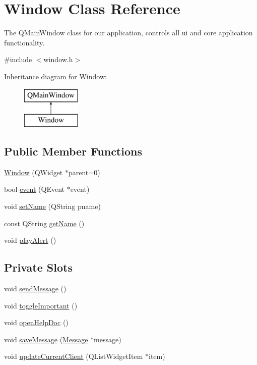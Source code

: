\hypertarget{class_window}{}\section{Window Class Reference}
\label{class_window}


The Q\+Main\+Window class for our application, controls all ui and core application functionality.  




{\ttfamily \#include $<$window.\+h$>$}

Inheritance diagram for Window\+:\begin{figure}[H]
\begin{center}
\leavevmode
\includegraphics[height=2.000000cm]{class_window}
\end{center}
\end{figure}
\subsection*{Public Member Functions}
\begin{DoxyCompactItemize}
\item 
\hyperlink{class_window_ab27fe44e0834066236f79f244b02f67e}{Window} (Q\+Widget $\ast$parent=0)
\item 
bool \hyperlink{class_window_a0af393c895469fe202200eefb7e43e5e}{event} (Q\+Event $\ast$event)
\item 
void \hyperlink{class_window_a881940d1cff5b0ed7af7c601443e25d0}{set\+Name} (Q\+String pname)
\item 
const Q\+String \hyperlink{class_window_aa6c44398bab8bc643a1fe1472fe223e5}{get\+Name} ()
\item 
void \hyperlink{class_window_a9a63b5db3c68174e5cb50a4254f4dfe6}{play\+Alert} ()
\end{DoxyCompactItemize}
\subsection*{Private Slots}
\begin{DoxyCompactItemize}
\item 
void \hyperlink{class_window_a85e9aae377ed9b8179a162e2a286e7db}{send\+Message} ()
\item 
void \hyperlink{class_window_adfc7e2bf6ecd158d55025d05d8c45499}{toggle\+Important} ()
\item 
void \hyperlink{class_window_a1413affe9b805287af0c386d78346ea5}{open\+Help\+Doc} ()
\item 
void \hyperlink{class_window_abff605e7ff8389da3ee6704e396722d3}{save\+Message} (\hyperlink{struct_message}{Message} $\ast$message)
\item 
void \hyperlink{class_window_ac3c08dc3a42a66a69d105d5b8c96c28b}{update\+Current\+Client} (Q\+List\+Widget\+Item $\ast$item)
\end{DoxyCompactItemize}
